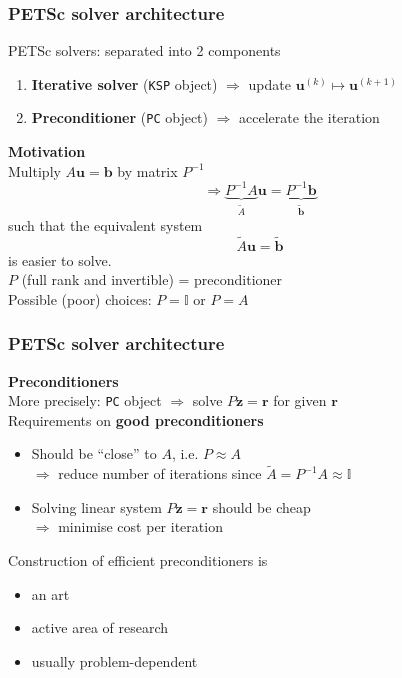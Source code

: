 \documentclass{beamer}
\begin{document}

\begin{frame}[fragile]
  \frametitle{PETSc solver architecture}
PETSc solvers: separated into 2 components
\begin{enumerate}
\item \textbf{Iterative solver} (\lstinline{KSP} object) $\Rightarrow$ update $\boldsymbol{u}^{(k)}\mapsto \boldsymbol{u}^{(k+1)}$
\item \textbf{Preconditioner} (\lstinline{PC} object) $\Rightarrow$ accelerate the iteration
\end{enumerate}
\vspace{2ex}
\textbf{Motivation}\\
Multiply $A\boldsymbol{u}=\boldsymbol{b}$ by matrix $P^{-1}$ 
$$
\Rightarrow \underbrace{P^{-1} A}_{\widetilde{A}} \boldsymbol{u} = \underbrace{P^{-1} \boldsymbol{b}}_{\widetilde{\boldsymbol{b}}}
$$
such that the equivalent system
$$
\widetilde{A} \boldsymbol{u} = \widetilde{\boldsymbol{b}}
$$
is easier to solve.\\[2ex]
$P$ (full rank and invertible) = preconditioner\\[1ex]
Possible (poor) choices: $P=\mathbb{I}$ or $P=A$\\
\end{frame}


\begin{frame}[fragile]
  \frametitle{PETSc solver architecture}
  \textbf{Preconditioners}\\
More precisely: \lstinline{PC} object $\Rightarrow$ solve $P\boldsymbol{z}=\boldsymbol{r}$ for given $\boldsymbol{r}$\\[2ex]
Requirements on \textbf{good preconditioners}
\begin{itemize}
\item Should be ``close'' to $A$, i.e. $P\approx A$\\
$\Rightarrow$ reduce number of iterations since $\widetilde{A}=P^{-1}A\approx\mathbb{I}$
\item Solving linear system $P\boldsymbol{z}=\boldsymbol{r}$ should be cheap\\
$\Rightarrow$ minimise cost per iteration
\end{itemize}
Construction of efficient preconditioners is
\begin{itemize}
\item an art
\item active area of research
\item usually problem-dependent
\end{itemize}
\end{frame}
\end{document}
